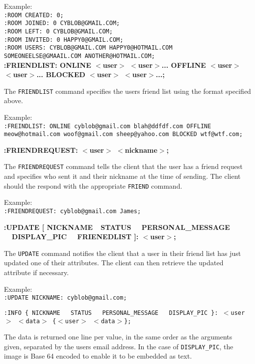 Example: \\
\texttt{:ROOM CREATED: 0;} \\
\texttt{:ROOM JOINED: 0 CYBLOB@GMAIL.COM;} \\
\texttt{:ROOM LEFT: 0 CYBLOB@GMAIL.COM;} \\
\texttt{:ROOM INVITED: 0 HAPPY0@GMAIL.COM;} \\
\texttt{:ROOM USERS: CYBLOB@GMAIL.COM HAPPY0@HOTMAIL.COM \\SOMEONEELSE@GMAAIL.COM ANOTHER@HOTMAIL.COM;} \\

{\bf :FRIENDLIST: ONLINE $<$user$>$ $<$user$>$... OFFLINE $<$user$>$ $<$user$>$... BLOCKED $<$user$>$ $<$user$>$...;}

The \texttt{FRIENDLIST} command specifies the users friend list using the format specified above.

Example: \\
\texttt{:FREINDLIST: ONLINE cyblob@gmail.com blah@ddfdf.com OFFLINE meow@hotmail.com woof@gmail.com sheep@yahoo.com BLOCKED wtf@wtf.com;}

{\bf :FRIENDREQUEST: $<$user$>$ $<$nickname$>$;}

The \texttt{FRIENDREQUEST} command tells the client that the user has a friend request and specifies who sent it and their nickname at the time of sending. The client should the respond with the appropriate \texttt{FRIEND} command.

Example: \\
\texttt{:FRIENDREQUEST: cyblob@gmail.com James;}

{\bf :UPDATE [ NICKNAME\ \vline \ STATUS \ \vline \ PERSONAL\_MESSAGE \ \vline \ DISPLAY\_PIC \ \vline \ FRIENEDLIST  ]: $<$user$>$;}

The \texttt{UPDATE} command notifies the client that a user in their friend list has just updated one of their attributes. The client can then retrieve the updated attribute if necessary.

Example: \\
\texttt{:UPDATE NICKNAME: cyblob@gmail.com;}

\texttt{:INFO \{ NICKNAME \ \vline \ STATUS \ \vline \ PERSONAL\_MESSAGE \ \vline \ DISPLAY\_PIC \}: $<$user$>$ $<$data$>$ \{$<$user$>$ $<$data$>$\};} 

The data is returned one line per value, in the same order as the arguments given, separated by the users email address. In the case of \texttt{DISPLAY\_PIC}, the image is Base 64 encoded to enable it to be embedded as text.

